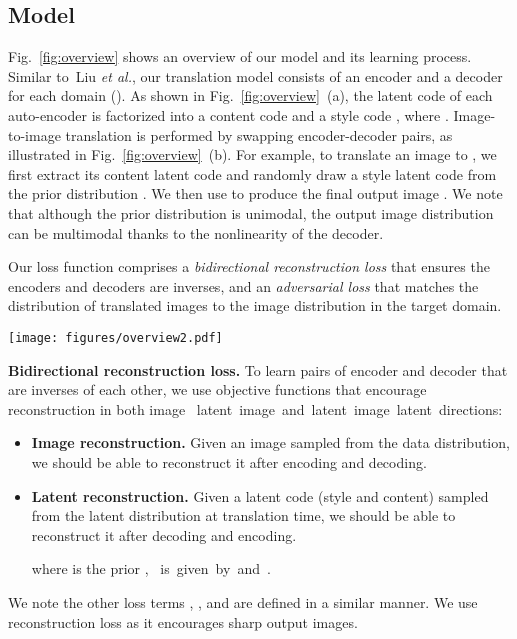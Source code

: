 \documentclass[runningheads]{llncs}
\newcommand{\vpara}[1]{\vspace{0.05in}\noindent\textbf{#1}}
\def\etal{\emph{et al.}\xspace}
\begin{document}
	\subsection{Model}
	\label{sec:model}	
	Fig.~\ref{fig:overview} shows an overview of our model and its learning process. Similar to~Liu \etal\cite{liu2017unsupervised}, our translation model consists of an encoder  and a decoder   for each domain  (). As shown in Fig.~\ref{fig:overview}~(a), the latent code of each auto-encoder is factorized into a content code  and a style code , where . Image-to-image translation is performed by swapping encoder-decoder pairs, as illustrated in Fig.~\ref{fig:overview}~(b). For example, to translate an image  to , we first extract its content latent code  and randomly draw a style latent code  from the prior distribution . We then use  to produce the final output image . We note that although the prior distribution is unimodal, the output image distribution can be multimodal thanks to the nonlinearity of the decoder.
	
	Our loss function comprises a \textit{bidirectional reconstruction loss} that ensures the encoders and decoders are inverses, and an \textit{adversarial loss} that matches the distribution of translated images to the image distribution in the target domain.
	
	\begin{figure*}[!tb]
		\centering
		\texttt{[image: figures/overview2.pdf]}
\caption{Model overview. Our image-to-image translation model consists of two auto-encoders~(denoted by \textcolor{myred}{red} and \textcolor{myblue}{blue} arrows respectively), one for each domain. The latent code of each auto-encoder is composed of a content code  and a style code . We train the model with adversarial objectives~(dotted lines) that ensure the translated images to be indistinguishable from real images in the target domain, as well as bidirectional reconstruction objectives~(dashed lines) that reconstruct both images and latent codes. 
} 		
		\label{fig:overview}
\end{figure*}
	\vpara{Bidirectional reconstruction loss.} To learn pairs of encoder and decoder that are inverses of each other, we use objective functions that encourage reconstruction in both image \mbox{ latent  image and latent  image  latent directions}:
	\begin{itemize}[leftmargin=*]
		\item {\bf Image reconstruction.} Given an image sampled from the data distribution, we should be able to reconstruct it after encoding and decoding.
		
		\item {\bf Latent reconstruction.} Given a latent code (style and content) sampled from the latent distribution at translation time, we should be able to reconstruct it after decoding and encoding.
		
		where  is the prior , \mbox{ is given by  and .}
	\end{itemize}
	We note the other loss terms , , and  are defined in a similar manner. We use  reconstruction loss as it encourages sharp output images.
	
\end{document}
